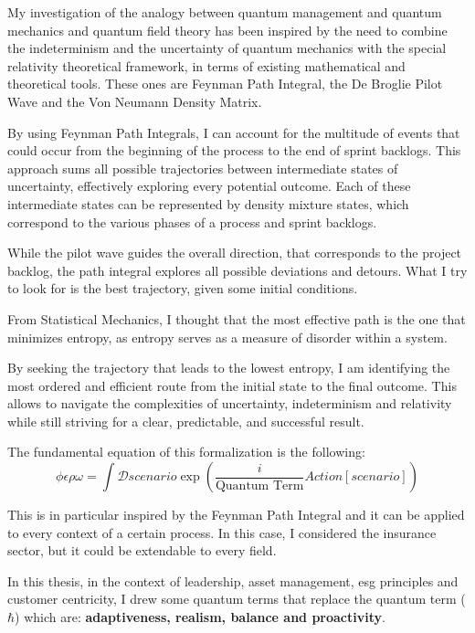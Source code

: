 \documentclass{article}
\begin{document}
My investigation of the analogy between quantum management and quantum mechanics and quantum field theory has been inspired by the need to combine the indeterminism and the uncertainty of quantum mechanics with the special relativity theoretical framework, in terms of existing mathematical and theoretical tools. These ones are Feynman Path Integral, the De Broglie Pilot Wave and the Von Neumann Density Matrix.

By using Feynman Path Integrals, I can account for the multitude of events that could occur from the beginning of the process to the end of sprint backlogs. This approach sums all possible trajectories between intermediate states of uncertainty, effectively exploring every potential outcome. Each of these intermediate states can be represented by density mixture states, which correspond to the various phases of a process and sprint backlogs.

While the pilot wave guides the overall direction, that corresponds to the project backlog, the path integral explores all possible deviations and detours. What I try to look for is the best trajectory, given some initial conditions.

From Statistical Mechanics, I thought that the most effective path is the one that minimizes entropy, as entropy serves as a measure of disorder within a system. 

By seeking the trajectory that leads to the lowest entropy, I am identifying the most ordered and efficient route from the initial state to the final outcome. This allows to navigate the complexities of uncertainty, indeterminism and relativity while still striving for a clear, predictable, and successful result.

The fundamental equation of this formalization is the following:
\begin{equation}
    \phi \epsilon \rho \omega = \int \mathcal{D}scenario \exp\left( \frac{i}{\text{Quantum Term}} Action[scenario] \right)
\end{equation}

This is in particular inspired by the Feynman Path Integral and it can be applied to every context of a certain process. In this case, I considered the insurance sector, but it could be extendable to every field.

In this thesis, in the context of leadership, asset management, esg principles and customer centricity, I drew some quantum terms that replace the quantum term ($\hbar$) which are:
\textbf{adaptiveness, realism, balance and proactivity}.
\end{document}
